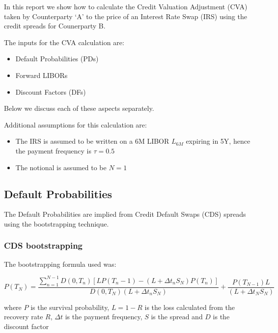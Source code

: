 \documentclass{article}
\providecommand{\tightlist}{%
      \setlength{\itemsep}{0pt}\setlength{\parskip}{0pt}}
\begin{document}
    In this report we show how to calculate the Credit Valuation Adjustment
(CVA) taken by Counterparty `A' to the price of an Interest Rate Swap
(IRS) using the credit spreads for Counerparty B.

The inputs for the CVA calculation are:

\begin{itemize}
\tightlist
\item
  Default Probabilities (PDs)
\item
  Forward LIBORs
\item
  Discount Factors (DFs)
\end{itemize}

Below we discuss each of these aspects separately.

Additional assumptions for this calculation are:

\begin{itemize}
\tightlist
\item
  The IRS is assumed to be written on a 6M LIBOR \(L_{6M}\) expiring in
  5Y, hence the payment frequency is \(\tau=0.5\)
\item
  The notional is assumed to be \(N=1\)
\end{itemize}

    \subsection{Default Probabilities}\label{default-probabilities}

The Default Probabilities are implied from Credit Default Swaps (CDS)
spreads using the bootstrapping technique.

    \subsubsection{CDS bootstrapping}\label{cds-bootstrapping}

    The bootstrapping formula used was:

\[
P(T_N) = \frac{ \sum^{N−1}_{n=1} D(0, T_n)
[ LP(T_n−1) − (L+ \Delta t_n S_N) P(T_n)]}
{ D(0, T_N)(L+ \Delta t_n S_N) }
+
\frac{P(T_{N−1})L}
{(L+\Delta t_N S_N)}
\]

where \(P\) is the survival probability, \(L = 1-R\) is the loss
calculated from the recovery rate \(R\), \(\Delta t\) is the payment
frequency, \(S\) is the spread and \(D\) is the discount factor
\end{document}
